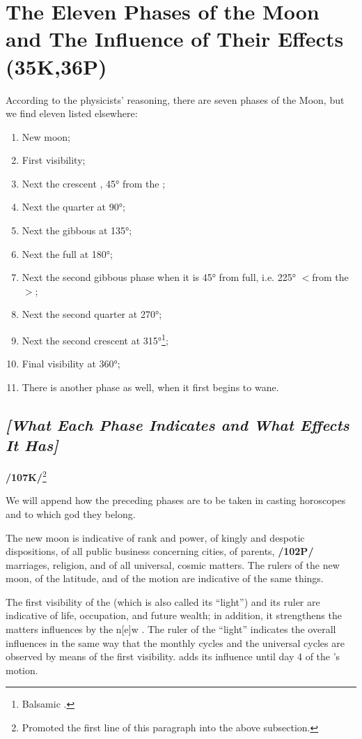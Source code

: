 \section{The Eleven Phases of the Moon and The Influence of Their Effects (35K,36P)}

According to the physicists’ reasoning, there are seven phases of the Moon, but we find eleven listed elsewhere:

\begin{enumerate}
\item New moon;
\item First visibility;
\item Next the crescent \Moon, 45° from the \Sun;
\item Next the quarter \Moon\xspace at 90°;
\item Next the gibbous \Moon\xspace at 135°;
\item Next the full \Moon\xspace at 180°;
\item Next the second gibbous phase when it is 45° from full, i.e. 225° $<$from the \Sun$>$;
\item Next the second quarter at 270°;
\item Next the second crescent at 315°\footnote{Balsamic \Moon.};
\item Final visibility at 360°;
\item There is another phase as well, when it first begins to wane.
\end{enumerate}

 \subsection{\textit{[What Each Phase Indicates and What Effects It Has]}}

\textbf{/107K/}\footnote{Promoted the first line of this paragraph into the above subsection.} 

We will append how the preceding phases are to be taken in casting horoscopes and to which god they belong.

The new moon is indicative of rank and power, of kingly and despotic dispositions, of all public business concerning cities, of parents, \textbf{/102P/} marriages, religion, and of all universal, cosmic matters. The rulers of the new moon, of the latitude, and of the motion are indicative of the same things. 

The first visibility of the \Moon\xspace (which is also called its “light”) and its ruler are indicative of life, occupation, and future wealth; in addition, it strengthens the matters influences by the n[e]w \Moon. The ruler of the “light” indicates the overall influences in the same way that the monthly cycles and the universal cycles are observed by means of the first visibility. \Mercury\xspace adds its influence until day 4 of the \Moon’s motion.

